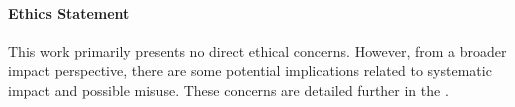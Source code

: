\paragraph{Ethics Statement} This work primarily presents no direct ethical concerns. However, from a broader impact perspective, there are some potential implications related to systematic impact and possible misuse. These concerns are detailed further in the .


